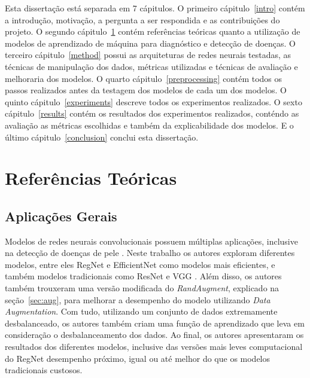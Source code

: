 \documentclass[ %
	msc, %
	portugues %
]{../ppgccufmg}
\begin{document}
    Esta dissertação está separada em 7 cápitulos. O primeiro cápitulo~\ref{intro} contém a introdução, motivação, a
    pergunta a ser respondida e as contribuições do projeto. O segundo cápitulo~\ref{background}
    contém referências teóricas quanto a utilização de modelos de aprendizado de máquina para
    diagnóstico e detecção de doenças. O terceiro cápitulo~\ref{method} possui as arquiteturas de redes neurais
    testadas, as técnicas de manipulação dos dados, métricas utilizadas e técnicas de avaliação e
    melhoraria dos modelos. O quarto cápitulo~\ref{preprocessing} contém todos os passos realizados antes da testagem
    dos modelos de cada um dos modelos. O quinto cápitulo~\ref{experiments} descreve todos os
    experimentos realizados. O sexto cápitulo~\ref{results} contém os resultados dos experimentos realizados,
    conténdo as avaliação as métricas escolhidas e também da explicabilidade dos modelos. E o último
    cápitulo~\ref{conclusion} conclui esta dissertação.



    \chapter{Referências Teóricas}\label{background}

    \section{Aplicações Gerais}

    Modelos de redes neurais convolucionais possuem múltiplas aplicações, inclusive na detecção de
    doenças de pele \citep{skinlesion}.
    Neste trabalho os autores exploram diferentes modelos, entre eles RegNet \citep{https://doi.org/10.48550/arxiv.2101.00590}
    e EfficientNet \citep{efficientnet} como modelos mais eficientes, e também modelos tradicionais
    como ResNet \citep{DBLP:journals/corr/HeZRS15} e VGG \citep{vgg}. Além disso, os autores também
    trouxeram uma versão modificada do \textit{RandAugment}, explicado na seção~\ref{sec:aug}, para
    melhorar a desempenho do modelo utilizando \textit{Data Augmentation}. Com tudo, utilizando um
    conjunto de dados extremamente desbalanceado, os autores também criam uma função de aprendizado
    que leva em consideração o desbalanceamento dos dados. Ao final, os autores apresentaram os
    resultados dos diferentes modelos, inclusive das versões mais leves computacional do RegNet
    desempenho próximo, igual ou até melhor do que os modelos tradicionais custosos.
\end{document}
